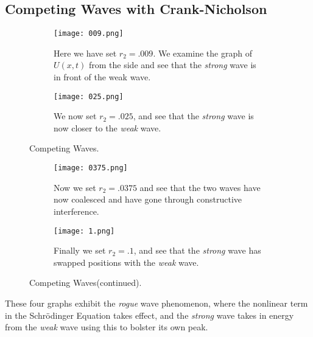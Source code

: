 \documentclass[11pt, oneside]{article}   	%
\begin{document}
\subsection{Competing Waves with Crank-Nicholson}
\begin{figure}[H]
    \begin{subfigure}{0.5\textwidth}
        \centering\captionsetup{width=.85\linewidth}%
        \texttt{[image: 009.png]}
        \caption{Here we have set $r_2 = .009$. We examine the graph of $U(x,t)$ from the side and see that the \textit{strong} wave is in front of the weak wave. }
        \label{NLS1 Constants of Motion}
    \end{subfigure}
    \begin{subfigure}{0.5\textwidth}
        \centering\captionsetup{width=.85\linewidth}%
        \texttt{[image: 025.png]}
        \caption{We now set $r_2 = .025$, and see that the \textit{strong} wave is now closer to the \textit{weak} wave.}
        \label{NLS1 Constants of Motion}
    \end{subfigure}
\caption{Competing Waves.}
\label{fig:image2}
\end{figure}

\begin{figure}[H]
    \begin{subfigure}{0.5\textwidth}
        \centering\captionsetup{width=.85\linewidth}%
        \texttt{[image: 0375.png]}
        \caption{Now we set $r_2 = .0375$ and see that the two waves have now coalesced and have gone through constructive interference.}
        \label{NLS1 Mesh}
    \end{subfigure}
    \begin{subfigure}{0.5\textwidth}
        \centering\captionsetup{width=.85\linewidth}%
        \texttt{[image: 1.png]}
        \caption{Finally we set $r_2 = .1$, and see that the \textit{strong} wave has swapped positions with the \textit{weak} wave.} 
        \label{NLS1 Constants of Motion}
    \end{subfigure}
\label{fig:image2}
\caption{Competing Waves(continued).}
\end{figure}

These four graphs exhibit the \textit{rogue} wave phenomenon, where the nonlinear term in the Schr\"odinger Equation takes effect, and the \textit{strong} wave takes in energy from the \textit{weak} wave using this to bolster its own peak.
\end{document}
